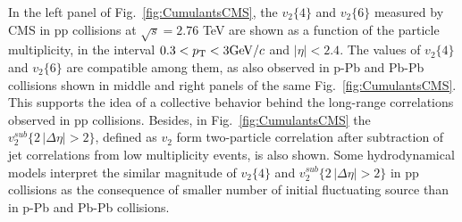 In the left panel of Fig.~\ref{fig:CumulantsCMS}, the $v_2 \{4\}$ and $v_2 \{6\}$ measured by CMS in pp collisions at $\sqrt{s} = 2.76$ TeV are shown as a function of the particle multiplicity, in the interval $0.3 < p_{\rm T} < 3 \mathrm{GeV}/c$ and $|\eta| < 2.4$. The values of $v_2 \{4\}$ and $v_2 \{6\}$ are compatible among them, as also observed in p-Pb and Pb-Pb collisions shown in middle and right panels of the same Fig.~\ref{fig:CumulantsCMS}. This supports the idea of a collective behavior behind the long-range correlations observed in pp collisions. Besides, in Fig.~\ref{fig:CumulantsCMS} the $v_2^{sub} \{2\, |\Delta \eta| > 2\}$, defined as $v_2$ form two-particle correlation after subtraction of jet correlations from low multiplicity events, is also shown. Some hydrodynamical models interpret the similar magnitude of $v_2 \{4\}$ and $v_2^{sub} \{2\, |\Delta \eta| > 2\}$ in pp collisions as the consequence of smaller number of initial fluctuating source than in p-Pb and Pb-Pb collisions.\\
